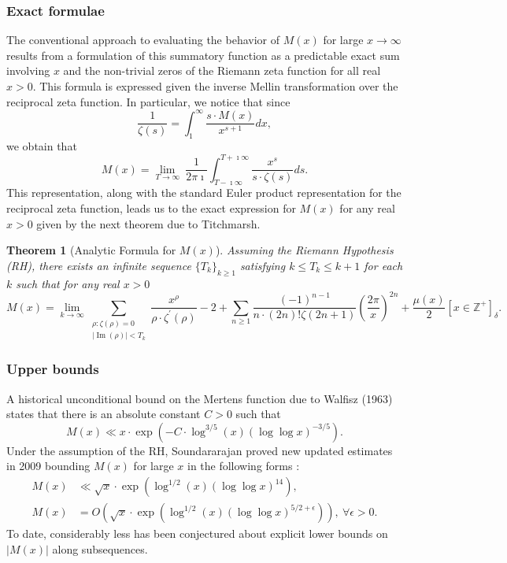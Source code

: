 \documentclass[11pt,reqno,a4letter]{article}
\numberwithin{figure}{section}
\numberwithin{table}{section}
\newcommand{\Iverson}[1]{\ensuremath{\left[#1\right]_{\delta}}}
\theoremstyle{plain}
\newtheorem{theorem}{Theorem}
\numberwithin{theorem}{section}
\theoremstyle{definition}
\renewcommand{\Im}{\operatorname{Im}}
\begin{document}
\subsubsection{Exact formulae} 

The conventional approach to evaluating the behavior of $M(x)$ for large 
$x \rightarrow \infty$ results from a formulation of this summatory 
function as a predictable exact sum involving $x$ and the non-trivial 
zeros of the Riemann zeta function for all real $x > 0$. 
This formula is expressed given the inverse Mellin transformation 
over the reciprocal zeta function. In particular, 
we notice that since 
\[
\frac{1}{\zeta(s)} = \int_1^{\infty} \frac{s \cdot M(x)}{x^{s+1}} dx, 
\]
we obtain that 
\[
M(x) = \lim_{T \rightarrow \infty}\ \frac{1}{2\pi\imath} \int_{T-\imath\infty}^{T+\imath\infty} 
     \frac{x^s}{s \cdot \zeta(s)} ds. 
\] 
This representation, along with the standard Euler product 
representation for the reciprocal zeta function, leads us to the 
exact expression for $M(x)$ for any real $x > 0$ 
given by the next theorem due to Titchmarsh. 
\nocite{TITCHMARSH} 

\begin{theorem}[Analytic Formula for $M(x)$] 
\label{theorem_MxMellinTransformInvFormula} 
Assuming the Riemann Hypothesis (RH), there exists an infinite sequence 
$\{T_k\}_{k \geq 1}$ satisfying $k \leq T_k \leq k+1$ for each $k$ 
such that for any real $x > 0$ 
\[
M(x) = \lim_{k \rightarrow \infty} 
     \sum_{\substack{\rho: \zeta(\rho) = 0 \\ |\Im(\rho)| < T_k}} 
     \frac{x^{\rho}}{\rho \cdot \zeta^{\prime}(\rho)} - 2 + 
     \sum_{n \geq 1} \frac{(-1)^{n-1}}{n \cdot (2n)! \zeta(2n+1)} 
     \left(\frac{2\pi}{x}\right)^{2n} + 
     \frac{\mu(x)}{2} \Iverson{x \in \mathbb{Z}^{+}}. 
\] 
\end{theorem} 

\subsubsection{Upper bounds} 

A historical unconditional bound on the Mertens function due to Walfisz (1963) 
states that there is an absolute constant $C > 0$ such that 
$$M(x) \ll x \cdot \exp\left(-C \cdot \log^{3/5}(x) 
  (\log\log x)^{-3/5}\right).$$ 
Under the assumption of the RH, Soundararajan proved new updated estimates in 2009 
bounding $M(x)$ for large $x$ in the following forms \cite{SOUND-MERTENS-ANNALS}: 
\begin{align*} 
M(x) & \ll \sqrt{x} \cdot \exp\left(\log^{1/2}(x) (\log\log x)^{14}\right), \\ 
M(x) & = O\left(\sqrt{x} \cdot \exp\left( 
     \log^{1/2}(x) (\log\log x)^{5/2+\epsilon}\right)\right),\ 
     \forall \epsilon > 0. 
\end{align*} 
To date, 
considerably less has been conjectured about explicit lower bounds on $|M(x)|$ along 
subsequences. 
\end{document}
